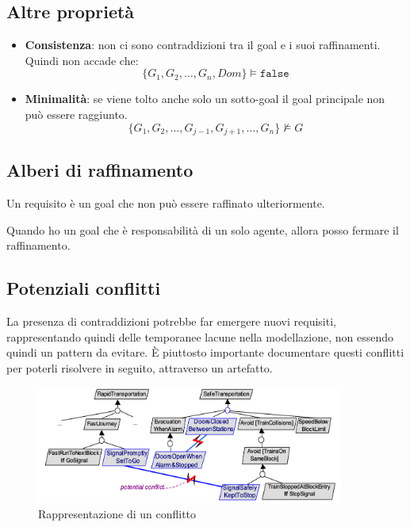 \subsection{Altre proprietà}
\begin{itemize}
    \item \textbf{Consistenza}: non ci sono contraddizioni tra il goal e i suoi raffinamenti.
    Quindi non accade che:
    \[
    \{ G_1, G_2, \ldots, G_n, Dom \} \models \texttt{false}
    \]
    \item \textbf{Minimalità}: se viene tolto anche solo un sotto-goal il goal principale
    non può essere raggiunto.
    \[
    \{ G_1, G_2, \ldots, G_{j-1}, G_{j+1}, \ldots, G_n \} \not\models G
    \]
\end{itemize}
\subsection{Alberi di raffinamento}
\begin{tcolorbox}[colback=violet!5!white,colframe=violet!75!black, title=Requisito]
    Un requisito è un goal che non può essere raffinato ulteriormente.
\end{tcolorbox}
Quando ho un goal che è responsabilità di un solo agente, allora posso 
fermare il raffinamento.
\subsection{Potenziali conflitti}
La presenza di contraddizioni potrebbe far emergere nuovi requisiti, rappresentando quindi 
delle temporanee lacune nella modellazione, non essendo quindi un pattern da evitare. È piuttosto 
importante documentare questi conflitti per poterli risolvere in seguito, attraverso un artefatto.
\begin{figure}[H]
    \centering
    \includegraphics[width=0.9\textwidth]{img/conflitto.png}
    \caption{Rappresentazione di un conflitto}
\end{figure}
